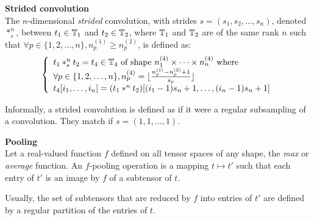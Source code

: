 \begin{definition}\textbf{Strided convolution}\\
The $n$-dimensional \emph{strided} convolution, with strides $s = (s_1, s_2, \ldots, s_n)$, denoted $\ast^n_s$, between $t_1 \in \mathbb{T}_1$ and $t_2 \in \mathbb{T}_2$, where $\mathbb{T}_1$ and $\mathbb{T}_2$ are of the same rank $n$ such that $\forall p \in \{1, 2, \ldots, n\}, n_p^{(1)} \ge n_p^{(2)}$, is defined as:
\begin{gather*}
\left\{
  \begin{array}{l}
    t_1 \ast^n_s t_2 = t_4 \in  \mathbb{T}_4 \text{ of shape } n_1^{(4)} \times \cdots \times n_n^{(4)}
    \text{ where} \\
    \forall p \in \{1, 2, \ldots, n\}, n_p^{(4)} = \lfloor\frac{n_p^{(1)} - n_p^{(2)} + 1}{s_p}\rfloor \\
    t_4[i_1, \ldots, i_n] = (t_1 \ast^n t_2)[(i_1 - 1)s_n + 1, \ldots, (i_n - 1)s_n + 1]\\
  \end{array}
\right.
\end{gather*}
\end{definition}

\begin{remark}
Informally, a strided convolution is defined as if it were a regular subsampling of a convolution. They match if $s = (1,1,\ldots,1)$.
\end{remark}

\begin{definition}\textbf{Pooling}\\
Let a real-valued function $f$ defined on all tensor spaces of any shape, \eg the \emph{max} or \emph{average} function.
An $f$-pooling operation is a mapping $t \mapsto t'$ such that each entry of $t'$ is an image by $f$ of a subtensor of $t$.
\end{definition}

\begin{remark}
Usually, the set of subtensors that are reduced by $f$ into entries of $t'$ are defined by a regular partition of the entries of $t$.
\end{remark}